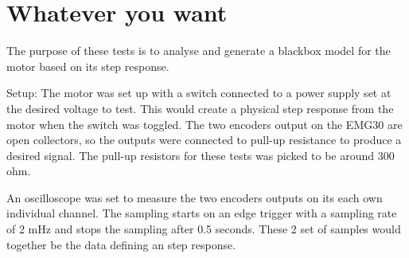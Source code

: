 \section{Whatever you want}

The purpose of these tests is to analyse and generate a blackbox model for the motor based on its step response. 

Setup:
The motor was set up with a switch connected to a power supply set at the desired voltage to test. This would create a physical step response from the motor when the switch was toggled. The two encoders output on the EMG30 are open collectors, so the outputs were connected to pull-up resistance to produce a desired signal. The pull-up resistors for these tests was picked to be around 300 ohm.

An oscilloscope was set to measure the two encoders outputs on its each own individual channel. The sampling starts on an edge trigger with a sampling rate of 2 mHz and stops the sampling after 0.5 seconds.
These 2 set of samples would together be the data defining an step response.
